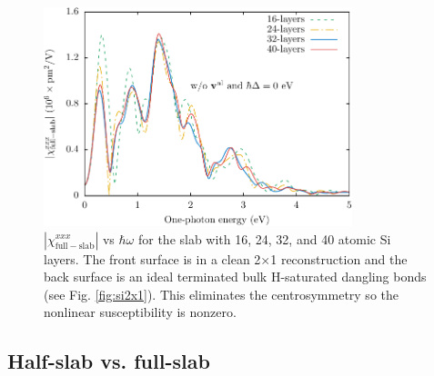 \documentclass[11pt]{book}
\begin{document}
{\begin{figure}
\centering 
\includegraphics[width=0.8\textwidth]{../figures/04-results/fig-4_1_02}
\caption{$|\chi_{\mathrm{full-slab}}^{xxx}|$ vs $\hbar\omega$
for the slab with 16, 24, 32, and 40 atomic Si layers. The front surface is in a
clean 2$\times$1 reconstruction and the back surface is an ideal terminated bulk
H-saturated dangling bonds (see Fig. \ref{fig:si2x1}). This eliminates the
centrosymmetry so the nonlinear susceptibility is nonzero.
\label{fig:layersconv}}
\end{figure}



\subsection{Half-slab vs. full-slab}

}
\end{document}
